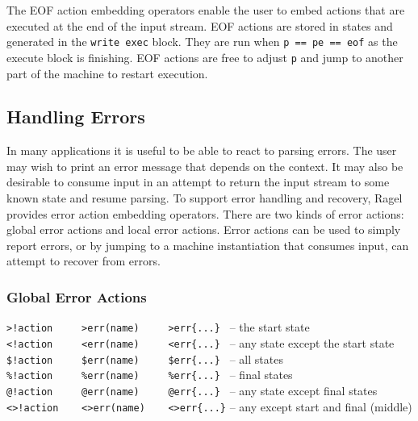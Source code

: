 \documentclass[letterpaper,11pt,oneside]{book}
\begin{document}
The EOF action embedding operators enable the user to embed actions that are
executed at the end of the input stream. EOF actions are stored in states and
generated in the \verb|write exec| block. They are run when \verb|p == pe == eof|
as the execute block is finishing. EOF actions are free to adjust \verb|p| and
jump to another part of the machine to restart execution.

\subsection{Handling Errors}

In many applications it is useful to be able to react to parsing errors.  The
user may wish to print an error message that depends on the context.  It
may also be desirable to consume input in an attempt to return the input stream
to some known state and resume parsing. To support error handling and recovery,
Ragel provides error action embedding operators. There are two kinds of error
actions: global error actions and local error actions.
Error actions can be used to simply report errors, or by jumping to a machine
instantiation that consumes input, can attempt to recover from errors.  

\subsubsection{Global Error Actions}

\noindent\hspace*{24pt}\verb|>!action     >err(name)     >err{...} | -- the start state\\
\noindent\hspace*{24pt}\verb|<!action     <err(name)     <err{...} | -- any state except the start state\\
\noindent\hspace*{24pt}\verb|$!action     $err(name)     $err{...} | -- all states\\
\noindent\hspace*{24pt}\verb|%!action     %err(name)     %err{...} | -- final states\\
\noindent\hspace*{24pt}\verb|@!action     @err(name)     @err{...} | -- any state except final states\\
\noindent\hspace*{24pt}\verb|<>!action    <>err(name)    <>err{...}| -- any except start and final (middle)
\vspace{12pt}
\end{document}
